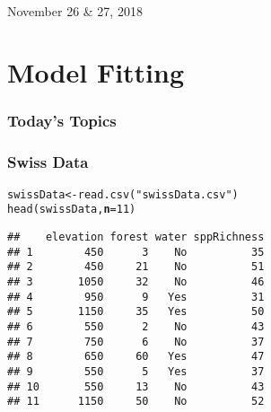\documentclass[color=usenames,dvipsnames]{beamer}\usepackage[]{graphicx}\usepackage[]{color}
\makeatletter
\newcommand{\hlnum}[1]{\textcolor[rgb]{0.69,0.494,0}{#1}}%
\newcommand{\hlstr}[1]{\textcolor[rgb]{0.749,0.012,0.012}{#1}}%
\newcommand{\hlstd}[1]{\textcolor[rgb]{0,0,0}{#1}}%
\newcommand{\hlkwb}[1]{\textcolor[rgb]{0,0.341,0.682}{#1}}%
\newcommand{\hlkwc}[1]{\textcolor[rgb]{0,0,0}{\textbf{#1}}}%
\newcommand{\hlkwd}[1]{\textcolor[rgb]{0.004,0.004,0.506}{#1}}%
\newenvironment{kframe}{%
 \def\at@end@of@kframe{}%
 \ifinner\ifhmode%
  \def\at@end@of@kframe{\end{minipage}}%
  \begin{minipage}{\columnwidth}%
 \fi\fi%
 \def\FrameCommand##1{\hskip\@totalleftmargin \hskip-\fboxsep
 \colorbox{shadecolor}{##1}\hskip-\fboxsep
     \hskip-\linewidth \hskip-\@totalleftmargin \hskip\columnwidth}%
 \MakeFramed {\advance\hsize-\width
   \@totalleftmargin\z@ \linewidth\hsize
   \@setminipage}}%
 {\par\unskip\endMakeFramed%
 \at@end@of@kframe}
\newenvironment{knitrout}{}{} %
\makeatother
\begin{document}



\begin{frame}[plain]
  \centering \huge
  {\color{RoyalBlue}{Lab 14 -- Model selection and Multimodel Inference}} \\
  \vspace{1cm}
  \LARGE
  November 26 \& 27, 2018 \par
\end{frame}




\section{Model Fitting}



\begin{frame}[plain]
  \frametitle{Today's Topics}
  \LARGE
\end{frame}




\begin{frame}[fragile]
  \frametitle{Swiss Data}
\begin{knitrout}\small
{}\color{fgcolor}\begin{kframe}
\begin{alltt}
\hlstd{swissData} \hlkwb{<-} \hlkwd{read.csv}\hlstd{(}\hlstr{"swissData.csv"}\hlstd{)}
\hlkwd{head}\hlstd{(swissData,} \hlkwc{n}\hlstd{=}\hlnum{11}\hlstd{)}
\end{alltt}
\begin{verbatim}
##    elevation forest water sppRichness
## 1        450      3    No          35
## 2        450     21    No          51
## 3       1050     32    No          46
## 4        950      9   Yes          31
## 5       1150     35   Yes          50
## 6        550      2    No          43
## 7        750      6    No          37
## 8        650     60   Yes          47
## 9        550      5   Yes          37
## 10       550     13    No          43
## 11      1150     50    No          52
\end{verbatim}
\end{kframe}
\end{knitrout}
\end{frame}
\end{document}
